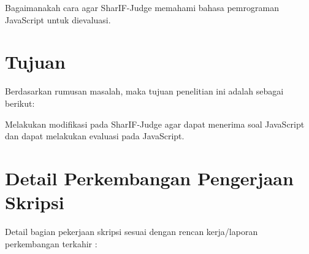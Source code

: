 \documentclass[a4paper,twoside]{article}
\begin{document}
     Bagaimanakah cara agar SharIF-Judge memahami bahasa pemrograman JavaScript untuk dievaluasi.

\section{Tujuan}
Berdasarkan rumusan masalah, maka tujuan penelitian ini adalah sebagai berikut:

    Melakukan modifikasi pada SharIF-Judge agar dapat menerima soal JavaScript dan dapat melakukan evaluasi pada JavaScript.


\section{Detail Perkembangan Pengerjaan Skripsi}
Detail bagian pekerjaan skripsi sesuai dengan rencan kerja/laporan perkembangan terkahir :
\end{document}
